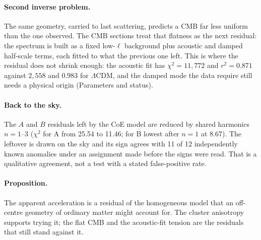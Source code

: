 \documentclass[10pt,twocolumn]{article}
\begin{document}
\paragraph{Second inverse problem.} The same geometry, carried to last scattering, predicts a CMB far less uniform than the one observed. The CMB sections treat that flatness as the next residual: the spectrum is built as a fixed low-$\ell$ background plus acoustic and damped half-scale terms, each fitted to what the previous one left. This is where the residual does not shrink enough: the acoustic fit has $\chi^2=11{,}772$ and $r^2=0.871$ against $2{,}558$ and $0.983$ for $\Lambda$CDM, and the damped mode the data require still needs a physical origin (Parameters and status).

\paragraph{Back to the sky.} The $A$ and $B$ residuals left by the CoE model are reduced by shared harmonics $n=1$--3 ($\chi^2$ for A from 25.54 to 11.46; for B lowest after $n=1$ at 8.67). The leftover is drawn on the sky and its sign agrees with 11 of 12 independently known anomalies under an assignment made before the signs were read. That is a qualitative agreement, not a test with a stated false-positive rate.

\paragraph{Proposition.} The apparent acceleration is a residual of the homogeneous model that an off-centre geometry of ordinary matter might account for. The cluster anisotropy supports trying it; the flat CMB and the acoustic-fit tension are the residuals that still stand against it.
\end{document}
